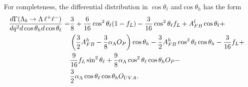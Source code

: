 %
%

For completeness, the differential distribution in $\cos\theta_\ell$ and$\cos\theta_h$ has the form
\begin{align}
\frac{d\Gamma(\Lambda_{b}\rightarrow \Lambda \,\ell^{+}\ell^{-})}{dq^2d\cos\theta_h d\cos\theta_\ell}=&
\frac{3}{8}+\frac{6}{16}\cos^2\theta_\ell(1-f_L)-\frac{3}{16}\cos^2\theta_\ell f_L
+A_{FB}^l\cos\theta_\ell+ \nonumber \\
& \left(\frac{3}{2}A_{FB}^h-\frac{3}{8}\alpha_\Lambda O_P\right)\cos\theta_h
-\frac{3}{2}A_{FB}^h\cos^2\theta_\ell\cos\theta_h-\frac{3}{16}f_L+ \nonumber \\
& \frac{9}{16}f_L\sin^2\theta_\ell+\frac{9}{8}\alpha_\Lambda \cos^2\theta_\ell\cos\theta_h O_P- \nonumber \\
& \frac{3}{2}\alpha_\Lambda \cos\theta_\ell\cos\theta_h O_{UVA}.
\label{eq:2DcosThetaLandB}
\end{align}


